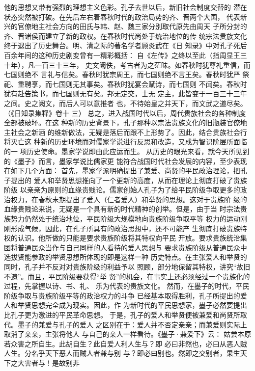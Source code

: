 \documentclass[12pt,UTF8]{ctexbook}
\begin{document}
他的思想又带有强烈的理想主义色彩。孔子去世以后，新旧社会制度交替的 
潜在状态突然被打破。在先后左右着春秋时代的政治局势的齐、晋两个大国， 
代表新兴的官僚地主社会方向的田氏与韩、赵、魏三家分别取代原先由周天 
子所分封的齐、晋诸侯而建立了新的政权。在春秋时代尚处于统治地位的传 
统宗法贵族文化终于退出了历史舞台。明、清之际的著名学者顾炎武在《日 
知录》中对孔子死后百余年间的这种历史剧变曾有一精彩概括： 
自《左传》之终以至此（指周显王三十年），凡一百三十三年， 
史文阙佚，考古者为之茫昧。如春秋时犹尊礼重信，而七国则绝不 
言礼与信矣。春秋时犹宗周王，而七国则绝不言王矣。春秋时犹严 
祭祀、重聘享，而七国则无其事矣。春秋时犹宴会赋诗，而七国则 
不闻矣。春秋时犹有赴告策书，而七国则无有矣。邦无定交，士无 
定主，此皆变于一百三十三年之间。史之阙文，而后人可以意推者 
也，不待始皇之并天下，而文武之道尽矣。（《日知录集释》卷十 
三） 
总之，进入战国时代以后，周代贵族社会的各种制度全部被破坏。在这 
种新的历史背景下，孔子那种以宗法贵族文化的旧瓶装官僚地主社会之新酒 
的维新做法，无疑是落后而跟不上形势了。因此，结合贵族社会行将灭亡这 
种新的历史环境而对儒家学说进行反思和改造，又成为智识阶层所面临的一 
项历史使命。墨家学说即由此应运而生。 
从历史的眼光来看，就今天所见到的《墨子》而言，墨家学说比儒家更 
能符合战国时代社会发展的内容，至少表现在如下几个方面： 
首先，墨家学派明确提出了兼爱、尚贤的平民政治理论，把孔子提出的 
爱人和举贤思想推向了一个更新的高度，从而在理论上彻底打破了贵族阶级 
以亲亲为原则的血缘贵贱论。儒家创始人孔子为了给平民阶级争取更多的政 
治权力，在春秋末期提出了爱人（仁者爱人）和举贤的思想。这对于贵族阶 
级的血缘贵贱论来说，无疑是一个具有新的时代精神的创举。但是，由于当 
时宗法贵族势力仍然处于统治地位，平民阶级大规模地向贵族阶级争取平等 
权力的运动刚刚形成气候，因此，在孔子所具有的政治思想中，还不可能产 
生彻底打破贵族特权的认识。他所做的只能是要求贵族阶级将其特权向平民 
开放。要求贵族统治集团将普通民众当作与自己同样的人看待的爱人思想与 
要求贵族阶级从普通民众中选拔贤能参政的举贤思想所体现的即是这样一种 
历史特点。在主张爱人和举贤的同时，孔子并不反对对贵族阶级的利益予以 
照顾，部分地保留其特权，讲究“故旧不遗”。而且，平民阶级要获得“举 
贤”的机会，在事实上还必须经过一个贵族化的过程，先掌握以诗、书、礼、 
乐为代表的贵族文化。 
然而，在墨子的时代，平民阶级争取与贵族阶级平等的政治权力的斗争 
已经基本取得胜利，孔子所提出的爱人和举贤思想完全成为现实。因此，作 
为新时代的平民思想家，墨子必然要提出比孔子更为激进的平民革命思想。 
于是，孔子的爱人和举贤便被兼爱和尚贤所取代。墨子的兼爱与孔子的爱人 
之区别在于：爱人并不否定亲亲；而兼爱则实际上取消了亲亲，主张将他人 
与自己的亲人一样看待。《墨子·兼爱下》云： 
姑尝本原若众害之所自生。此胡自生？此自爱人利人生与？即 
必曰非然也，必曰从恶人贼人生。分名乎天下恶人而贼人者兼与别 
与？即必曰别也。然即之交别者，果生天下之大害者与！是故别非 
\end{document}
